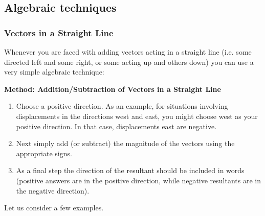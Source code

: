 \subsection*{Algebraic techniques}
\subsubsection*{Vectors in a Straight Line}

Whenever you are faced with adding vectors acting in a straight line (i.e. some directed left and some right, or some acting up and others down) you can use a very simple algebraic technique:\\

\begin{minipage}{\textwidth}
\textbf{Method: Addition/Subtraction of Vectors in a Straight Line}
\begin{enumerate}[noitemsep, label=\textbf{\arabic*}.]
\item{Choose a positive direction. As an example, for
situations involving displacements in the directions west and east, you
might choose west as your positive direction. In that case,
displacements east are negative.}
\item{Next simply add (or subtract) the
magnitude of the vectors using the appropriate signs.}
\item{As a final step the direction of the resultant should be included in
words (positive answers are in the positive direction, while negative
resultants are in the negative direction).}\\
\end{enumerate}
\end{minipage}

Let us consider a few examples. 

